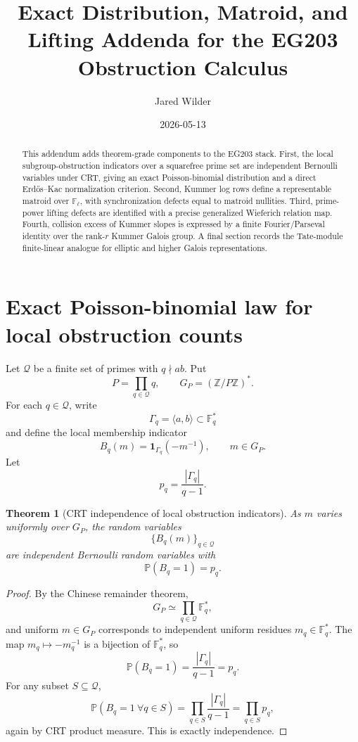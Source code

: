 \documentclass[11pt]{article}
\title{Exact Distribution, Matroid, and Lifting Addenda for the EG203 Obstruction Calculus}
\author{Jared Wilder}
\date{2026-05-13}
\newtheorem{theorem}{Theorem}
\newcommand{\Z}{\mathbb Z}
\newcommand{\F}{\mathbb F}
\newcommand{\one}{\mathbf 1}
\begin{document}
\maketitle

\begin{abstract}
This addendum adds theorem-grade components to the EG203 stack.  First, the local subgroup-obstruction indicators over a squarefree prime set are independent Bernoulli variables under CRT, giving an exact Poisson-binomial distribution and a direct Erd\H{o}s--Kac normalization criterion.  Second, Kummer log rows define a representable matroid over \(\F_\ell\), with synchronization defects equal to matroid nullities.  Third, prime-power lifting defects are identified with a precise generalized Wieferich relation map.  Fourth, collision excess of Kummer slopes is expressed by a finite Fourier/Parseval identity over the rank-\(r\) Kummer Galois group.  A final section records the Tate-module finite-linear analogue for elliptic and higher Galois representations.
\end{abstract}

\section{Exact Poisson-binomial law for local obstruction counts}

Let \(\mathcal Q\) be a finite set of primes with \(q\nmid ab\).  Put
\[
P=\prod_{q\in\mathcal Q}q,
\qquad
G_P=(\Z/P\Z)^*.
\]
For each \(q\in\mathcal Q\), write
\[
\Gamma_q=\langle a,b\rangle\subset\F_q^*
\]
and define the local membership indicator
\[
B_q(m)=\one_{\Gamma_q}(-m^{-1}) ,
\qquad m\in G_P.
\]
Let
\[
p_q=\frac{|\Gamma_q|}{q-1}.
\]

\begin{theorem}[CRT independence of local obstruction indicators]\label{T:crt-independence}
As \(m\) varies uniformly over \(G_P\), the random variables
\[
\{B_q(m)\}_{q\in\mathcal Q}
\]
are independent Bernoulli random variables with
\[
\mathbb P(B_q=1)=p_q.
\]
\end{theorem}

\begin{proof}
By the Chinese remainder theorem,
\[
G_P\simeq\prod_{q\in\mathcal Q}\F_q^*,
\]
and uniform \(m\in G_P\) corresponds to independent uniform residues \(m_q\in\F_q^*\).  The map \(m_q\mapsto -m_q^{-1}\) is a bijection of \(\F_q^*\), so
\[
\mathbb P(B_q=1)=\frac{|\Gamma_q|}{q-1}=p_q.
\]
For any subset \(S\subseteq\mathcal Q\),
\[
\mathbb P(B_q=1\ \forall q\in S)
=
\prod_{q\in S}\frac{|\Gamma_q|}{q-1}
=
\prod_{q\in S}p_q,
\]
again by CRT product measure.  This is exactly independence.
\end{proof}
\end{document}
